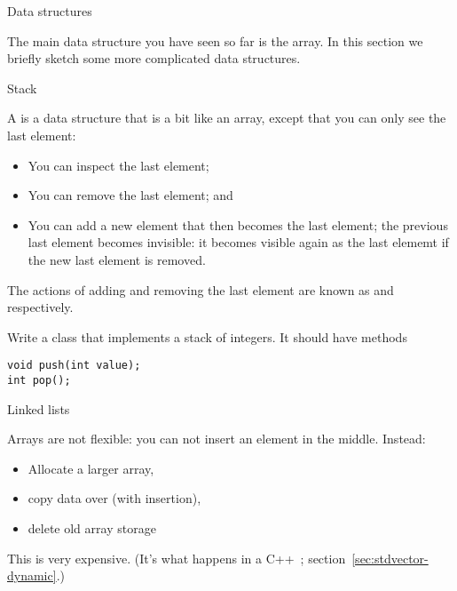 
 {Data structures}

The main data structure you have seen so far is the array. In this
section we briefly sketch some more complicated data structures.

 {Stack}

A  is a data structure that is a bit like an
array, except that you can only see the last element:
\begin{itemize}
\item You can inspect the last element;
\item You can remove the last element; and
\item You can add a new element that then becomes the last element;
  the previous last element becomes invisible: it becomes visible
  again as the last elememt if the new last element is removed.
\end{itemize}
The actions of adding and removing the last element are known as
 and  respectively.

\begin{exercise}
  Write a class that implements a stack of integers. It should have
  methods
\begin{verbatim}
void push(int value);
int pop();
\end{verbatim}
\end{exercise}

 {Linked lists}
\label{sec:linklist}

\prerequisite{\ref{ch:pointer}}

Arrays are not flexible: you can not insert an element in the
middle. Instead:
\begin{itemize}
\item Allocate a larger array,
\item copy data over (with insertion),
\item delete old array storage
\end{itemize}
This is very expensive. (It's what happens in a
C++~; section~\ref{sec:stdvector-dynamic}.)

